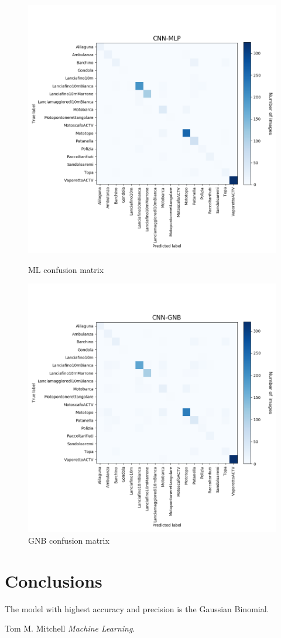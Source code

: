 \documentclass[12pt]{article}
\begin{document}
\begin{figure}[!ht]
	\centering
	\begin{minipage}{.5\textwidth}
		\centering
		\includegraphics[width=.8\linewidth]{../code/output/CNN-MLP.png}
		\caption{ML confusion matrix} %
		\label{fig:cnf_mlp}
	\end{minipage}%
	\begin{minipage}{.5\textwidth}
		\centering
		\includegraphics[width=.8\linewidth]{../code/output/CNN-GNB.png}
		\caption{GNB confusion matrix} %
		\label{fig:cnf_gnb}
	\end{minipage}
\end{figure}

\section{Conclusions}
The model with highest accuracy and precision is the Gaussian Binomial.

\newpage
\begin{thebibliography}{10}
	
	Tom M. Mitchell \textsl{Machine Learning}.
	
\end{thebibliography}
\end{document}
